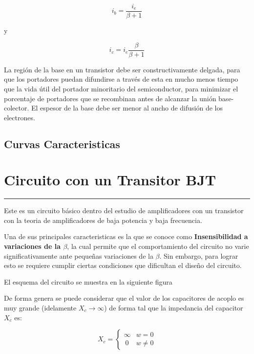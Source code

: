\documentclass{article}
\begin{document}
\begin{equation}
i_{b}= \frac{i_{e}}{\beta +1}
\end{equation}

y

\begin{equation}
i_{c}= i_{e}\frac{\beta}{\beta +1}
\end{equation}

La región de la base en un transistor debe ser constructivamente
delgada, para que los portadores puedan difundirse a través de esta en
mucho menos tiempo que la vida útil del portador minoritario del
semiconductor, para minimizar el porcentaje de portadores que se
recombinan antes de alcanzar la unión base-colector. El espesor de la
base debe ser menor al ancho de difusión de los electrones.

    \subsection{Curvas Caracteristicas}\label{curvas-caracteristicas}

    \section{Circuito con un Transitor
BJT}\label{circuito-con-un-transitor-bjt}

\begin{center}\rule{3in}{0.4pt}\end{center}

Este es un circuito básico dentro del estudio de amplificadores con un
transistor con la teoria de amplificadores de baja potencia y baja
frecuencia.

Una de sus principales caracteristicas es la que se conoce como
\textbf{Insensibilidad a variaciones de la $\beta$}, la cual permite que
el comportamiento del circuito no varie significativamente ante pequeñas
variaciones de la $\beta$. Sin embargo, para lograr esto se requiere
cumplir ciertas condiciones que dificultan el diseño del circuito.

El esquema del circuito se muestra en la siguiente figura

De forma genera se puede considerar que el valor de los capacitores de
acoplo es muy grande (idelamente $X_{c}\rightarrow\infty$) de forma tal
que la impedancia del capacitor $X_{c}$ es:

\begin{equation}\label{eq:xc}
X_{c}= \begin{cases}
\infty    & w=0 \\\
0 &  w \neq 0
\end{cases}
\end{equation}
\end{document}
